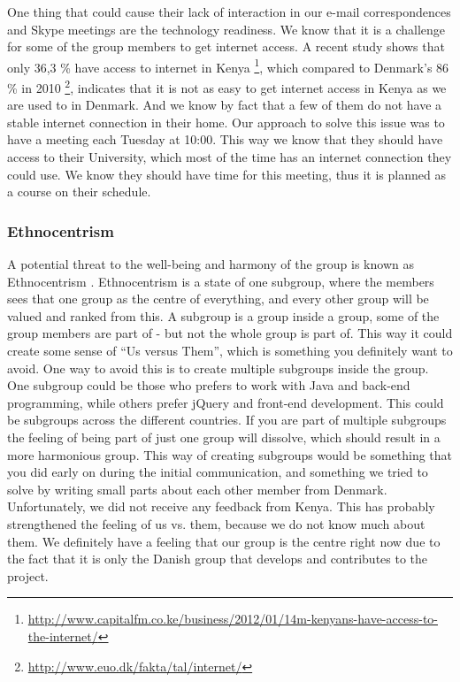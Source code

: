 One thing that could cause their lack of interaction in our e-mail correspondences and Skype meetings are the technology readiness. We know that it is a challenge for some of the group members to get internet access. A recent study shows that only 36,3 \% have access to internet in Kenya \footnote{\url{http://www.capitalfm.co.ke/business/2012/01/14m-kenyans-have-access-to-the-internet/}}, which compared to Denmark's 86 \% in 2010 \footnote{\url{http://www.euo.dk/fakta/tal/internet/}}, indicates that it is not as easy to get internet access in Kenya as we are used to in Denmark. And we know by fact that a few of them do not have a stable internet connection in their home. Our approach to solve this issue was to have a meeting each Tuesday at 10:00. This way we know that they should have access to their University, which most of the time has an internet connection they could use. We know they should have time for this meeting, thus it is planned as a course on their schedule.

\subsubsection{Ethnocentrism} \label{subsubsec:ethnocentrism}
A potential threat to the well-being and harmony of the group is known as Ethnocentrism \cite{durnell2004subgroup}. Ethnocentrism is a state of one subgroup, where the members sees that one group as the centre of everything, and every other group will be valued and ranked from this. A subgroup is a group inside a group, some of the group members are part of - but not the whole group is part of. This way it could create some sense of ``Us versus Them'', which is something you definitely want to avoid. One way to avoid this is to create multiple subgroups inside the group. One subgroup could be those who prefers to work with Java and back-end programming, while others prefer jQuery and front-end development. This could be subgroups across the different countries. If you are part of multiple subgroups the feeling of being part of just one group will dissolve, which should result in a more harmonious group.
This way of creating subgroups would be something that you did early on during the initial communication, and something we tried to solve by writing small parts about each other member from Denmark. Unfortunately, we did not receive any feedback from Kenya. This has probably strengthened the feeling of us vs. them, because we do not know much about them. We definitely have a feeling that our group is the centre right now due to the fact that it is only the Danish group that develops and contributes to the project.

